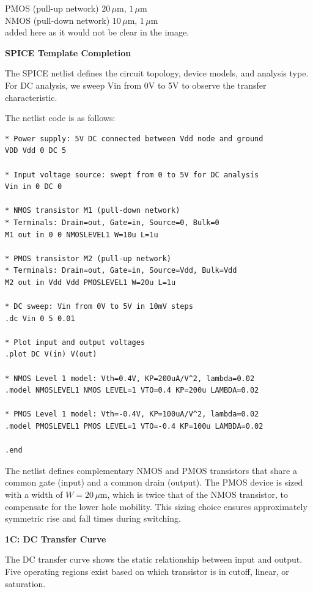 \documentclass[a4paper,12pt]{article}
\begin{document}
PMOS (pull-up network)  $20\,\mu\text{m}$, $1\,\mu\text{m}$ \\
NMOS (pull-down network) $10\,\mu\text{m}$, $1\,\mu\text{m}$ \\
added here as it would not be clear in the image.

\textbf{SPICE Template Completion}

The SPICE netlist defines the circuit topology, device models, and analysis type. For DC analysis, we sweep Vin from 0V to 5V to observe the transfer characteristic.

The netlist code is as follows:

\begin{lstlisting}[caption=SPICE template completion, label=lst:SPICE_complete]
* Power supply: 5V DC connected between Vdd node and ground
VDD Vdd 0 DC 5

* Input voltage source: swept from 0 to 5V for DC analysis
Vin in 0 DC 0

* NMOS transistor M1 (pull-down network)
* Terminals: Drain=out, Gate=in, Source=0, Bulk=0
M1 out in 0 0 NMOSLEVEL1 W=10u L=1u

* PMOS transistor M2 (pull-up network)
* Terminals: Drain=out, Gate=in, Source=Vdd, Bulk=Vdd
M2 out in Vdd Vdd PMOSLEVEL1 W=20u L=1u

* DC sweep: Vin from 0V to 5V in 10mV steps
.dc Vin 0 5 0.01

* Plot input and output voltages
.plot DC V(in) V(out)

* NMOS Level 1 model: Vth=0.4V, KP=200uA/V^2, lambda=0.02
.model NMOSLEVEL1 NMOS LEVEL=1 VTO=0.4 KP=200u LAMBDA=0.02

* PMOS Level 1 model: Vth=-0.4V, KP=100uA/V^2, lambda=0.02
.model PMOSLEVEL1 PMOS LEVEL=1 VTO=-0.4 KP=100u LAMBDA=0.02

.end
\end{lstlisting}

The netlist defines complementary NMOS and PMOS transistors that share a common gate (input) and a common drain (output). The PMOS device is sized with a width of $W = 20\,\mu\text{m}$, which is twice that of the NMOS transistor, to compensate for the lower hole mobility. This sizing choice ensures approximately symmetric rise and fall times during switching.

\textbf{1C: DC Transfer Curve}

The DC transfer curve shows the static relationship between input and output. Five operating regions exist based on which transistor is in cutoff, linear, or saturation.
\end{document}
